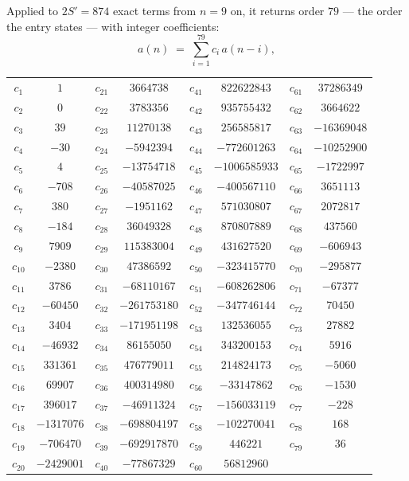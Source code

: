 \documentclass[11pt,a4paper]{article}
\theoremstyle{plain}
\theoremstyle{definition}
\begin{document}
Applied to $2S'=874$ exact terms from $n=9$ on, it returns order $79$ --- the
order the entry states --- with integer coefficients:
\[
a(n)\;=\;\sum_{i=1}^{79}c_i\,a(n-i),
\]
\begin{center}\small
\begin{tabular}{cccccccc}
$c_{1}$ & $1$ & $c_{21}$ & $3664738$ & $c_{41}$ & $822622843$ & $c_{61}$ & $37286349$ \\
$c_{2}$ & $0$ & $c_{22}$ & $3783356$ & $c_{42}$ & $935755432$ & $c_{62}$ & $3664622$ \\
$c_{3}$ & $39$ & $c_{23}$ & $11270138$ & $c_{43}$ & $256585817$ & $c_{63}$ & $-16369048$ \\
$c_{4}$ & $-30$ & $c_{24}$ & $-5942394$ & $c_{44}$ & $-772601263$ & $c_{64}$ & $-10252900$ \\
$c_{5}$ & $4$ & $c_{25}$ & $-13754718$ & $c_{45}$ & $-1006585933$ & $c_{65}$ & $-1722997$ \\
$c_{6}$ & $-708$ & $c_{26}$ & $-40587025$ & $c_{46}$ & $-400567110$ & $c_{66}$ & $3651113$ \\
$c_{7}$ & $380$ & $c_{27}$ & $-1951162$ & $c_{47}$ & $571030807$ & $c_{67}$ & $2072817$ \\
$c_{8}$ & $-184$ & $c_{28}$ & $36049328$ & $c_{48}$ & $870807889$ & $c_{68}$ & $437560$ \\
$c_{9}$ & $7909$ & $c_{29}$ & $115383004$ & $c_{49}$ & $431627520$ & $c_{69}$ & $-606943$ \\
$c_{10}$ & $-2380$ & $c_{30}$ & $47386592$ & $c_{50}$ & $-323415770$ & $c_{70}$ & $-295877$ \\
$c_{11}$ & $3786$ & $c_{31}$ & $-68110167$ & $c_{51}$ & $-608262806$ & $c_{71}$ & $-67377$ \\
$c_{12}$ & $-60450$ & $c_{32}$ & $-261753180$ & $c_{52}$ & $-347746144$ & $c_{72}$ & $70450$ \\
$c_{13}$ & $3404$ & $c_{33}$ & $-171951198$ & $c_{53}$ & $132536055$ & $c_{73}$ & $27882$ \\
$c_{14}$ & $-46932$ & $c_{34}$ & $86155050$ & $c_{54}$ & $343200153$ & $c_{74}$ & $5916$ \\
$c_{15}$ & $331361$ & $c_{35}$ & $476779011$ & $c_{55}$ & $214824173$ & $c_{75}$ & $-5060$ \\
$c_{16}$ & $69907$ & $c_{36}$ & $400314980$ & $c_{56}$ & $-33147862$ & $c_{76}$ & $-1530$ \\
$c_{17}$ & $396017$ & $c_{37}$ & $-46911324$ & $c_{57}$ & $-156033119$ & $c_{77}$ & $-228$ \\
$c_{18}$ & $-1317076$ & $c_{38}$ & $-698804197$ & $c_{58}$ & $-102270041$ & $c_{78}$ & $168$ \\
$c_{19}$ & $-706470$ & $c_{39}$ & $-692917870$ & $c_{59}$ & $446221$ & $c_{79}$ & $36$ \\
$c_{20}$ & $-2429001$ & $c_{40}$ & $-77867329$ & $c_{60}$ & $56812960$ &  &  \\
\end{tabular}
\end{center}
\end{document}

